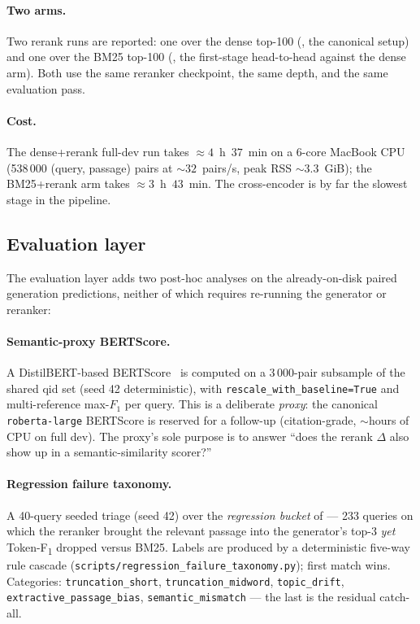 \documentclass[11pt,a4paper]{article}
\newcommand{\F}{F\textsubscript{1}}
\newcommand{\Tokenf}{Token-\F}
\newcommand{\bertscore}{BERTScore}
\newcommand{\bmtwofive}{BM25}
\begin{document}
\paragraph{Two arms.}  Two rerank runs are reported: one over the
dense top-100 (, the canonical setup) and
one over the \bmtwofive{} top-100 (, the first-stage
head-to-head against the dense arm).  Both use the same reranker
checkpoint, the same depth, and the same evaluation pass.

\paragraph{Cost.}  The dense+rerank full-dev run takes
$\approx\!4$~h~$37$~min on a 6-core MacBook CPU
(538\,000 (query, passage) pairs at $\sim\!32$~pairs/s, peak RSS
$\sim\!3.3$~GiB); the \bmtwofive{}+rerank arm takes
$\approx\!3$~h~$43$~min.  The cross-encoder is by far the slowest
stage in the pipeline.

\subsection{Evaluation layer}
\label{sec:w6-method}

The evaluation layer adds two post-hoc analyses on the already-on-disk paired
generation predictions, neither of which requires re-running the generator or reranker:

\paragraph{Semantic-proxy \bertscore{}.}  A DistilBERT-based
\bertscore{}~\cite{zhang2020bertscore,sanh2019distilbert} is
computed on a 3\,000-pair subsample of the shared qid set
(seed 42 deterministic), with
\texttt{rescale\_with\_baseline=True} and multi-reference max-$F_1$
per query.  This is a deliberate \emph{proxy}: the canonical
\texttt{roberta-large} \bertscore{} is reserved for a follow-up
(citation-grade, $\sim\!$hours of CPU on full dev).  The proxy's
sole purpose is to answer ``does the rerank $\Delta$ also show up in
a semantic-similarity scorer?''

\paragraph{Regression failure taxonomy.}  A 40-query seeded triage
(seed 42) over the \emph{regression bucket} of 
--- 233 queries on which the reranker brought the relevant passage
into the generator's top-3 \emph{yet} \Tokenf{} dropped versus
\bmtwofive{}.  Labels are produced by a deterministic five-way rule
cascade (\texttt{scripts/regression\_failure\_taxonomy.py}); first
match wins.  Categories: \texttt{truncation\_short},
\texttt{truncation\_midword}, \texttt{topic\_drift},
\texttt{extractive\_passage\_bias}, \texttt{semantic\_mismatch} ---
the last is the residual catch-all.
\end{document}
